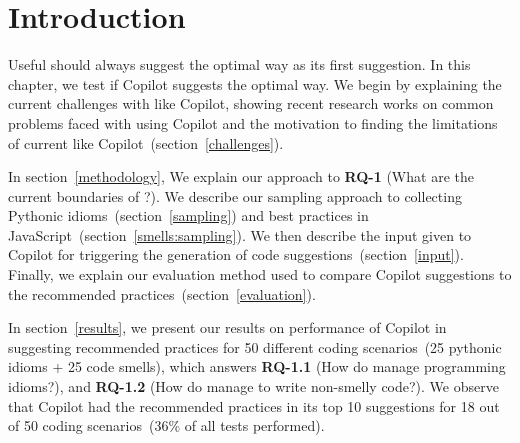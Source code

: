 \label{chapter:methodology}

\section{Introduction}
Useful \cct{} should always suggest the optimal way as its first suggestion. In this chapter, we test if Copilot suggests the optimal way. 
We begin by explaining the current challenges with \cct{} like Copilot, showing recent research works on common problems faced with using Copilot and the motivation to finding the limitations of current \cct{} like Copilot~(section~\ref{challenges}).

In section~\ref{methodology}, We explain our approach to \textbf{RQ-1} (What are the current boundaries of \cct{}?). 
We describe our sampling approach to collecting Pythonic idioms~(section~\ref{sampling}) and best practices in JavaScript~(section~\ref{smells:sampling}). We then describe the input given to Copilot for triggering the generation of code suggestions~(section~\ref{input}).
Finally, we explain our evaluation method used to compare Copilot suggestions to the recommended practices~(section~\ref{evaluation}).

In section~\ref{results}, we present our results on performance of Copilot in suggesting recommended practices for 50 different coding scenarios~(25 pythonic idioms + 25 code smells), which answers \textbf{RQ-1.1} (How do \cct{} manage programming idioms?), and \textbf{RQ-1.2} (How do \cct{} manage to write non-smelly code?).
We observe that Copilot had the recommended practices in its top 10 suggestions for 18 out of 50 coding scenarios~(36\% of all tests performed).



